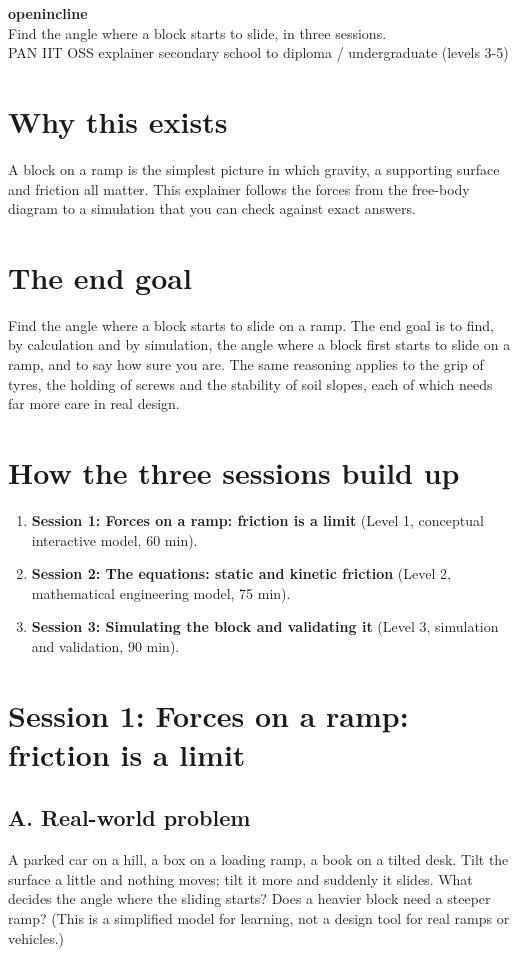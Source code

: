 \documentclass[11pt,a4paper]{article}
\begin{document}
\begin{center}{\LARGE\bfseries openincline}\\[0.4em]{\large Find the angle where a block starts to slide, in three sessions.}\\[0.2em]\small PAN IIT OSS explainer \textbullet{} secondary school to diploma / undergraduate (levels 3-5)\end{center}

\section*{Why this exists}
A block on a ramp is the simplest picture in which gravity, a supporting surface and friction all matter. This explainer follows the forces from the free-body diagram to a simulation that you can check against exact answers.

\section*{The end goal}
Find the angle where a block starts to slide on a ramp. The end goal is to find, by calculation and by simulation, the angle where a block first starts to slide on a ramp, and to say how sure you are. The same reasoning applies to the grip of tyres, the holding of screws and the stability of soil slopes, each of which needs far more care in real design.

\section*{How the three sessions build up}
\begin{enumerate}[nosep]
\item \textbf{Session 1: Forces on a ramp: friction is a limit} (Level 1, conceptual interactive model, 60 min).
\item \textbf{Session 2: The equations: static and kinetic friction} (Level 2, mathematical engineering model, 75 min).
\item \textbf{Session 3: Simulating the block and validating it} (Level 3, simulation and validation, 90 min).
\end{enumerate}

\section{Session 1: Forces on a ramp: friction is a limit}

\subsection*{A. Real-world problem}
A parked car on a hill, a box on a loading ramp, a book on a tilted desk. Tilt the surface a little and nothing moves; tilt it more and suddenly it slides. What decides the angle where the sliding starts? Does a heavier block need a steeper ramp? (This is a simplified model for learning, not a design tool for real ramps or vehicles.)
\end{document}
